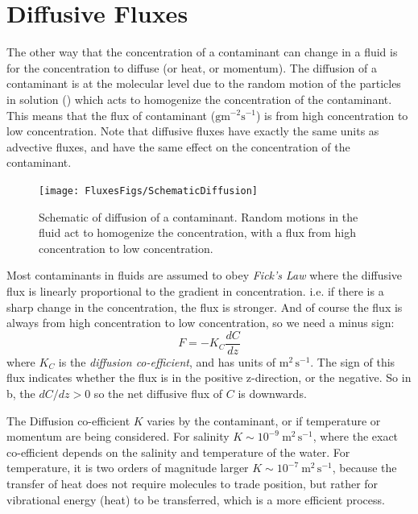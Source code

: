 \section{Diffusive Fluxes}

The other way that the concentration of a contaminant can change in a fluid is for the concentration to diffuse (or heat, or momentum).  The diffusion of a contaminant is at the molecular level due to the random motion of the particles in solution () which acts to homogenize the concentration of the contaminant.  This means that the flux of contaminant ($\mathrm{g m^{-2}s^{-1}}$) is from high concentration to low concentration.    Note that diffusive fluxes have exactly the same units as advective fluxes, and have the same effect on the concentration of the contaminant.  

\begin{figure}[hbt]
  \begin{center}
    \texttt{[image: FluxesFigs/SchematicDiffusion]}
    \caption{Schematic of diffusion of a contaminant.  Random motions in the fluid act to homogenize the concentration, with a flux from high concentration to low concentration. }
    \label{fig:SchematicDiffusion}  
  \end{center}
\end{figure}

Most contaminants in fluids are assumed to obey \emph{Fick's Law} where the diffusive flux is linearly proportional to the gradient in concentration.  i.e. if there is a sharp change in the concentration, the flux is stronger.  And of course the flux is always from high concentration to low concentration, so we need a minus sign:
\begin{equation}
    \label{eq:Ficks}
    F = -K_C \frac{dC}{dz}
\end{equation}
where $K_C$ is the \emph{diffusion co-efficient}, and has units of $\mathrm{m^2\,s^{-1}}$. The sign of this flux indicates whether the flux is in the positive z-direction, or the negative.  So in b, the $dC/dz > 0$ so the net diffusive flux of $C$ is downwards.  

The Diffusion co-efficient $K$ varies by the contaminant, or if temperature or momentum are being considered.  For salinity $K\sim 10^{-9} \ \mathrm{m^2\,s^{-1}}$, where the exact co-efficient depends on the salinity and temperature of the water.  For temperature, it is two orders of magnitude larger $K\sim 10^{-7}\ \mathrm{m^2\,s^{-1}}$, because the transfer of heat does not require molecules to trade position, but rather for vibrational energy (heat) to be transferred, which is a more efficient process.  


